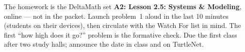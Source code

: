 \documentclass[10pt]{article}
\begin{document}
\begin{teachernote}[Homework]
The homework is the DeltaMath set \textbf{A2: Lesson 2.5: Systems \& Modeling}, online --- not in the packet.
Launch problem~1 aloud in the last 10 minutes (students on their devices), then circulate with
the Watch For list in mind. The first ``how high does it go?'' problem is the formative check.
Due the first class after two study halls; announce the date in class and on TurtleNet.
\end{teachernote}
\end{document}
